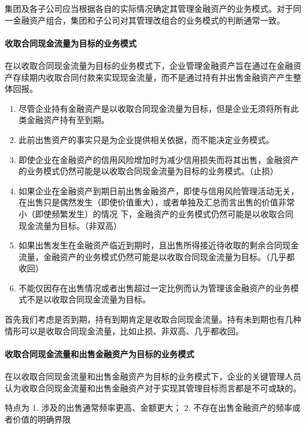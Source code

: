 \documentclass[UTF8,12pt]{ctexart}
\numberwithin{equation}{section} %
\numberwithin{figure}{section}
\numberwithin{table}{section}
\begin{document}
	集团及各子公司应当根据各自的实际情况确定其管理金融资产的业务模式。对于同一金融资产组合，集团和子公司对其管理改组合的业务模式的判断通常一致。
	
	\paragraph{收取合同现金流量为目标的业务模式}
	在以收取合同现金流量为目标的业务模式下，企业管理金融资产旨在通过在金融资产存续期内收取合同付款来实现现金流量，而不是通过持有并出售金融资产产生整体回报。
	
	\begin{enumerate}
		\item 尽管企业持有金融资产是以收取合同现金流量为目标，但是企业无须将所有此类金融资产持有至到期。
		
		\item 此前出售资产的事实只是为企业提供相关依据，而不能决定业务模式。
		
		\item 即使企业在金融资产的信用风险增加时为减少信用损失而将其出售，金融资产的业务模式仍然可能是以收取合同现金流量为目标的业务模式。（止损）
		
		\item 如果企业在金融资产到期日前出售金融资产，即使与信用风险管理活动无关，在出售只是偶然发生（即使价值重大），或者单独及汇总而言出售的价值非常小（即使频繁发生）的情况  下，金融资产的业务模式仍然可能是以收取合同现金流量为目标。（非双高）
		
		\item 如果出售发生在金融资产临近到期时，且出售所得接近待收取的剩余合同现金流量，金融资产的业务模式仍然可能是以收取合同现金流量为目标。（几乎都收回）
		
		\item 不能仅因存在出售情况或者出售超过一定比例而认为管理该金融资产的业务模式不是以收取合同现金流量为目标。
	\end{enumerate}
	
	首先我们考虑是否到期，持有到期肯定是收取合同现金流量。持有未到期也有几种情形可以是收取合同现金流量，比如止损、非双高、几乎都收回。
	
	\paragraph{收取合同现金流量和出售金融资产为目标的业务模式}
	在以收取合同现金流量和出售金融资产为目标的业务模式下，企业的关键管理人员认为收取合同现金流量和出售金融资产对于实现其管理目标而言都是不可或缺的。
	
	特点为
	1.	涉及的出售通常频率更高、金额更大；
	2.	不存在出售金融资产的频率或者价值的明确界限
	
\end{document}
